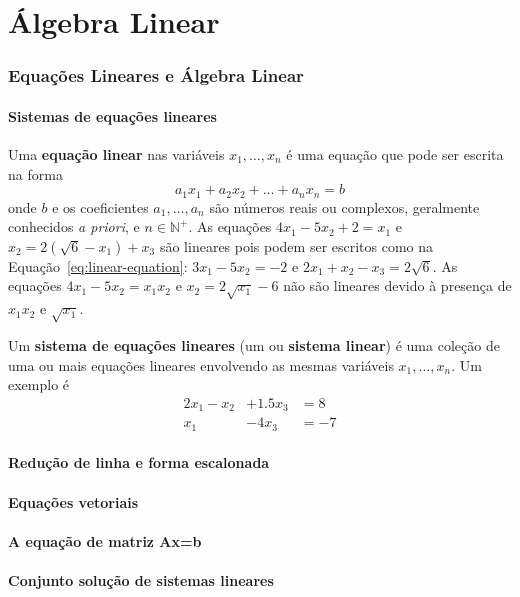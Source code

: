 \part{Álgebra Linear}
\section{Equações Lineares e Álgebra Linear}
\subsection{Sistemas de equações lineares}
Uma \textbf{equação linear} nas variáveis $x_1,\dots,x_n$ é uma equação que pode ser escrita na forma \begin{equation}\label{eq:linear-equation}
a_1x_1+a_2x_2+\dots+a_nx_n = b
\end{equation}
onde $b$ e os coeficientes $a_1,\dots,a_n$ são números reais ou complexos, geralmente conhecidos \textit{a priori}, e $n\in\mathds{N}^+$. As equações $4x_1-5x_2+2 = x_1$ e $x_2 = 2(\sqrt{6}-x_1)+x_3$ são lineares pois podem ser escritos como na Equação~\ref{eq:linear-equation}: $3x_1-5x_2=-2$ e $2x_1+x_2-x_3=2\sqrt{6}$. As equações $4x_1-5x_2=x_1x_2$ e $x_2=2\sqrt{x_1}-6$ não são lineares devido à presença de $x_1x_2$ e $\sqrt{x_1}$.

Um \textbf{sistema de equações lineares} (um ou \textbf{sistema linear}) é uma coleção de uma ou mais equações lineares envolvendo as mesmas variáveis $x_1,\dots,x_n$. Um exemplo é \begin{equation}
\begin{aligned}
2x_1 - x_2 &+ 1.5x_3& = 8\\
x_1 &- 4x_3&   = -7
\end{aligned}
\end{equation}

\subsection{Redução de linha e forma escalonada}
\subsection{Equações vetoriais}
\subsection{A equação de matriz Ax=b}
\subsection{Conjunto solução de sistemas lineares}

